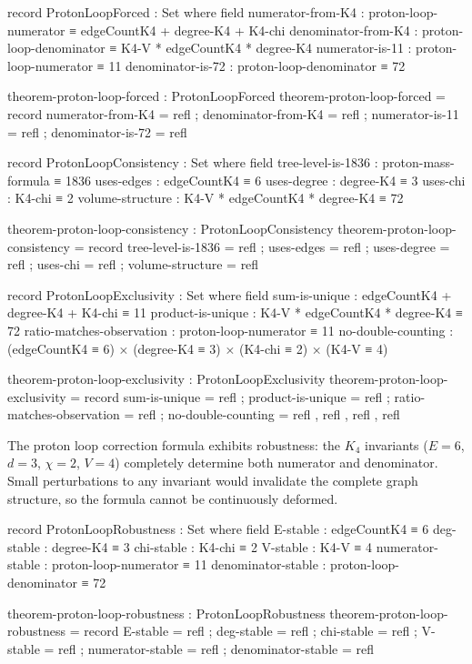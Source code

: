 \documentclass[11pt,a4paper]{book}
\begin{document}
\begin{code}
record ProtonLoopForced : Set where
  field
    numerator-from-K4 : proton-loop-numerator ≡ edgeCountK4 + degree-K4 + K4-chi
    denominator-from-K4 : proton-loop-denominator ≡ K4-V * edgeCountK4 * degree-K4
    numerator-is-11 : proton-loop-numerator ≡ 11
    denominator-is-72 : proton-loop-denominator ≡ 72

theorem-proton-loop-forced : ProtonLoopForced
theorem-proton-loop-forced = record
  { numerator-from-K4 = refl
  ; denominator-from-K4 = refl
  ; numerator-is-11 = refl
  ; denominator-is-72 = refl
  }

record ProtonLoopConsistency : Set where
  field
    tree-level-is-1836 : proton-mass-formula ≡ 1836
    uses-edges : edgeCountK4 ≡ 6
    uses-degree : degree-K4 ≡ 3
    uses-chi : K4-chi ≡ 2
    volume-structure : K4-V * edgeCountK4 * degree-K4 ≡ 72

theorem-proton-loop-consistency : ProtonLoopConsistency
theorem-proton-loop-consistency = record
  { tree-level-is-1836 = refl
  ; uses-edges = refl
  ; uses-degree = refl
  ; uses-chi = refl
  ; volume-structure = refl
  }

record ProtonLoopExclusivity : Set where
  field
    sum-is-unique : edgeCountK4 + degree-K4 + K4-chi ≡ 11
    product-is-unique : K4-V * edgeCountK4 * degree-K4 ≡ 72
    ratio-matches-observation : proton-loop-numerator ≡ 11
    no-double-counting : (edgeCountK4 ≡ 6) × (degree-K4 ≡ 3) × (K4-chi ≡ 2) × (K4-V ≡ 4)

theorem-proton-loop-exclusivity : ProtonLoopExclusivity
theorem-proton-loop-exclusivity = record
  { sum-is-unique = refl
  ; product-is-unique = refl
  ; ratio-matches-observation = refl
  ; no-double-counting = refl , refl , refl , refl
  }
\end{code}

The proton loop correction formula exhibits robustness: the $K_4$ invariants ($E = 6$, 
$d = 3$, $\chi = 2$, $V = 4$) completely determine both numerator and denominator. Small 
perturbations to any invariant would invalidate the complete graph structure, so the 
formula cannot be continuously deformed.

\begin{code}
record ProtonLoopRobustness : Set where
  field
    E-stable : edgeCountK4 ≡ 6
    deg-stable : degree-K4 ≡ 3
    chi-stable : K4-chi ≡ 2
    V-stable : K4-V ≡ 4
    numerator-stable : proton-loop-numerator ≡ 11
    denominator-stable : proton-loop-denominator ≡ 72

theorem-proton-loop-robustness : ProtonLoopRobustness
theorem-proton-loop-robustness = record
  { E-stable = refl
  ; deg-stable = refl
  ; chi-stable = refl
  ; V-stable = refl
  ; numerator-stable = refl
  ; denominator-stable = refl
  }
\end{code}
\end{document}
